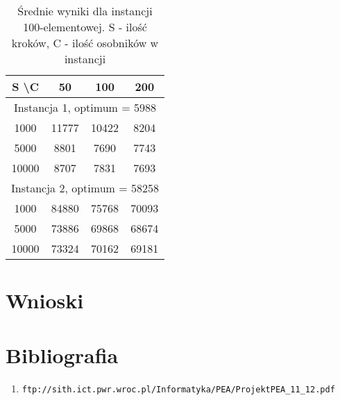   \begin{table}[h!]
  \begin{center}
  \caption{Średnie wyniki dla instancji 100-elementowej.
           {\small S - ilość kroków, C - ilość osobników w instancji}}
  \begin{tabular}{c|ccc}
    \hline
      S \textbackslash C & 50 & 100 & 200 \\
    \hline
      \multicolumn{4}{c}{Instancja 1, optimum = 5988} \\
    \hline
      1000  & 11777 & 10422 & 8204 \\ %
      5000  & 8801  & 7690  & 7743 \\ %
      10000 & 8707  & 7831  & 7693 \\ %
    \hline
      \multicolumn{4}{c}{Instancja 2, optimum = 58258} \\
    \hline
      1000  & 84880 & 75768 & 70093 \\ %
      5000  & 73886 & 69868 & 68674 \\ %
      10000 & 73324 & 70162 & 69181    %
  \end{tabular}
  \end{center}
  \end{table}


\section{Wnioski} %
  \label{sec:wnioski}



\appendix
\section{Bibliografia} %
  \label{sec:biblio}
  \begin{enumerate}
    \item \texttt{ftp://sith.ict.pwr.wroc.pl/Informatyka/PEA/ProjektPEA\_11\_12.pdf}
  \end{enumerate}

